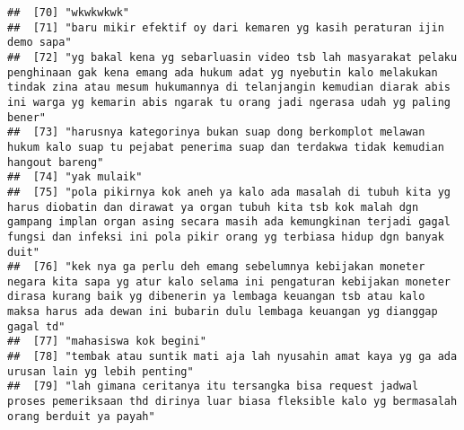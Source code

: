 \documentclass[
]{article}
\begin{document}
\begin{verbatim}
##  [70] "wkwkwkwk"                                                                                                                                                                                                                                                                          
##  [71] "baru mikir efektif oy dari kemaren yg kasih peraturan ijin demo sapa"                                                                                                                                                                                                              
##  [72] "yg bakal kena yg sebarluasin video tsb lah masyarakat pelaku penghinaan gak kena emang ada hukum adat yg nyebutin kalo melakukan tindak zina atau mesum hukumannya di telanjangin kemudian diarak abis ini warga yg kemarin abis ngarak tu orang jadi ngerasa udah yg paling bener"
##  [73] "harusnya kategorinya bukan suap dong berkomplot melawan hukum kalo suap tu pejabat penerima suap dan terdakwa tidak kemudian hangout bareng"                                                                                                                                       
##  [74] "yak mulaik"                                                                                                                                                                                                                                                                        
##  [75] "pola pikirnya kok aneh ya kalo ada masalah di tubuh kita yg harus diobatin dan dirawat ya organ tubuh kita tsb kok malah dgn gampang implan organ asing secara masih ada kemungkinan terjadi gagal fungsi dan infeksi ini pola pikir orang yg terbiasa hidup dgn banyak duit"      
##  [76] "kek nya ga perlu deh emang sebelumnya kebijakan moneter negara kita sapa yg atur kalo selama ini pengaturan kebijakan moneter dirasa kurang baik yg dibenerin ya lembaga keuangan tsb atau kalo maksa harus ada dewan ini bubarin dulu lembaga keuangan yg dianggap gagal td"      
##  [77] "mahasiswa kok begini"                                                                                                                                                                                                                                                              
##  [78] "tembak atau suntik mati aja lah nyusahin amat kaya yg ga ada urusan lain yg lebih penting"                                                                                                                                                                                         
##  [79] "lah gimana ceritanya itu tersangka bisa request jadwal proses pemeriksaan thd dirinya luar biasa fleksible kalo yg bermasalah orang berduit ya payah"                                                                                                                              

\end{verbatim}
\end{document}
